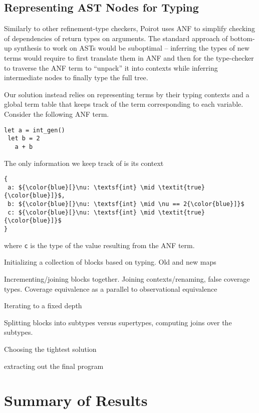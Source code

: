 \documentclass[review, sigplan]{acmart}
\begin{document}
\subsection{Representing AST Nodes for Typing}

Similarly to other refinement-type checkers, Poirot uses
ANF to simplify checking of dependencies of return types on arguments.
The standard approach of bottom-up synthesis to work on ASTs would
be suboptimal -- inferring the types of new terms would require to
first translate them in ANF and then for the type-checker to traverse
the ANF term to ``unpack'' it into contexts while inferring intermediate
nodes to finally type the full tree.

Our solution instead relies on representing terms by their
typing contexts and a global term table that keeps track of
the term corresponding to each variable.
Consider the following ANF term.
\begin{lstlisting}[language=caml, basicstyle=\small\ttfamily]
let a = int_gen()
 let b = 2
   a + b
\end{lstlisting}
The only information we keep track of is its context

\begin{lstlisting}[language=caml, basicstyle=\small\ttfamily, mathescape]
{
 a: ${\color{blue}[}\nu: \textsf{int} \mid \textit{true}{\color{blue}]}$,
 b: ${\color{blue}[}\nu: \textsf{int} \mid \nu == 2{\color{blue}]}$
 c: ${\color{blue}[}\nu: \textsf{int} \mid \textit{true}{\color{blue}]}$
}
\end{lstlisting}
where \lstinline|c| is the type of the value resulting from the
ANF term.


Initializing a collection of blocks based on typing. Old and new maps

Incrementing/joining blocks together. Joining contexts/renaming, false coverage
types. Coverage equivalence as a parallel to observational equivalence

Iterating to a fixed depth

Splitting blocks into subtypes versus supertypes, computing joins over the
subtypes.

Choosing the tightest solution

extracting out the final program

\section{Summary of Results}
\end{document}
